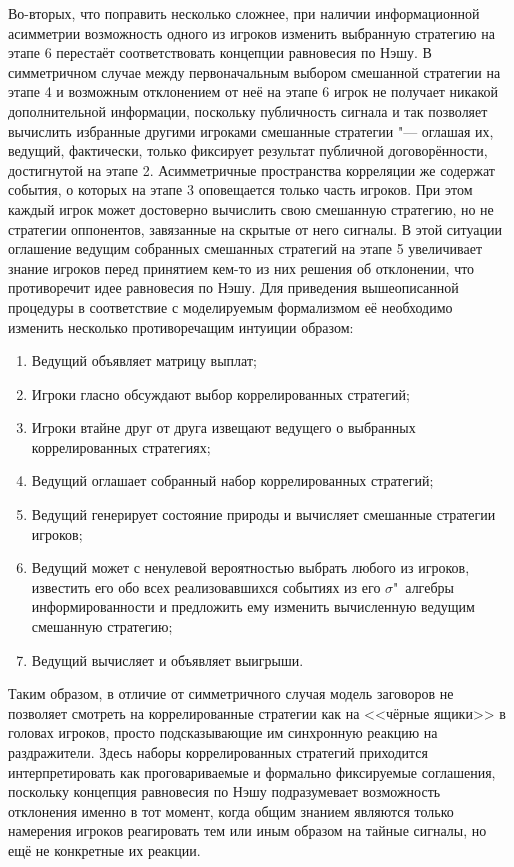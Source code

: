 Во-вторых, что поправить несколько сложнее, при наличии информационной асимметрии возможность одного из игроков изменить выбранную стратегию на этапе 6 перестаёт соответствовать концепции равновесия по Нэшу. В симметричном случае между первоначальным выбором смешанной стратегии на этапе 4 и возможным отклонением от неё на этапе 6 игрок не получает никакой дополнительной информации, поскольку публичность сигнала и так позволяет вычислить избранные другими игроками смешанные стратегии "--- оглашая их, ведущий, фактически, только фиксирует результат публичной договорённости, достигнутой на этапе 2. Асимметричные пространства корреляции же содержат события, о которых на этапе 3 оповещается только часть игроков. При этом каждый игрок может достоверно вычислить свою смешанную стратегию, но не стратегии оппонентов, завязанные на скрытые от него сигналы. В этой ситуации оглашение ведущим собранных смешанных стратегий на этапе 5 увеличивает знание игроков перед принятием кем-то из них решения об отклонении, что противоречит идее равновесия по Нэшу. Для приведения вышеописанной процедуры в соответствие с моделируемым формализмом её необходимо изменить несколько противоречащим интуиции образом:

\begin{enumerate}
	\item Ведущий объявляет матрицу выплат;
	\item Игроки гласно обсуждают выбор коррелированных стратегий;
	\item Игроки втайне друг от друга извещают ведущего о выбранных коррелированных стратегиях;
	\item Ведущий оглашает собранный набор коррелированных стратегий;
	\item Ведущий генерирует состояние природы и вычисляет смешанные стратегии игроков;
	\item Ведущий может с ненулевой вероятностью выбрать любого из игроков, известить его обо всех реализовавшихся событиях из его $\sigma$"~алгебры информированности и предложить ему изменить вычисленную ведущим смешанную стратегию;
	\item Ведущий вычисляет и объявляет выигрыши.
\end{enumerate}

Таким образом, в отличие от симметричного случая модель заговоров не позволяет смотреть на коррелированные стратегии как на <<чёрные ящики>> в головах игроков, просто подсказывающие им синхронную реакцию на раздражители. Здесь наборы коррелированных стратегий приходится интерпретировать как проговариваемые и формально фиксируемые соглашения, поскольку концепция равновесия по Нэшу подразумевает возможность отклонения именно в тот момент, когда общим знанием являются только намерения игроков реагировать тем или иным образом на тайные сигналы, но ещё не конкретные их реакции.

